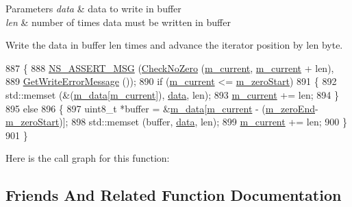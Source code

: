 \begin{DoxyParams}{Parameters}
{\em data} & data to write in buffer \\
\hline
{\em len} & number of times data must be written in buffer\\
\hline
\end{DoxyParams}
Write the data in buffer len times and advance the iterator position by len byte. 
\begin{DoxyCode}
887 \{
888   \hyperlink{assert_8h_aff5ece9066c74e681e74999856f08539}{NS\_ASSERT\_MSG} (\hyperlink{classns3_1_1Buffer_1_1Iterator_a0e3ce8d8b629c64493095486d4408ffd}{CheckNoZero} (\hyperlink{classns3_1_1Buffer_1_1Iterator_a762e0242d60f4d717158d0584e4accd6}{m\_current}, 
      \hyperlink{classns3_1_1Buffer_1_1Iterator_a762e0242d60f4d717158d0584e4accd6}{m\_current} + len),
889                  \hyperlink{classns3_1_1Buffer_1_1Iterator_ae37b790336264f34d65971231c3ed1f1}{GetWriteErrorMessage} ());
890   \textcolor{keywordflow}{if} (\hyperlink{classns3_1_1Buffer_1_1Iterator_a762e0242d60f4d717158d0584e4accd6}{m\_current} <= \hyperlink{classns3_1_1Buffer_1_1Iterator_aa1d37de1fc02ff0bf9efde8ea6ee5097}{m\_zeroStart})
891     \{
892       std::memset (&(\hyperlink{classns3_1_1Buffer_1_1Iterator_a406cd27bb4983e8ba23542eadbc9330b}{m\_data}[\hyperlink{classns3_1_1Buffer_1_1Iterator_a762e0242d60f4d717158d0584e4accd6}{m\_current}]), \hyperlink{topology-example-sim_8cc_a26c65296e316af77b787dc77469bb2a4}{data}, len);
893       \hyperlink{classns3_1_1Buffer_1_1Iterator_a762e0242d60f4d717158d0584e4accd6}{m\_current} += len;
894     \}
895   \textcolor{keywordflow}{else}
896     \{
897       uint8\_t *buffer = &\hyperlink{classns3_1_1Buffer_1_1Iterator_a406cd27bb4983e8ba23542eadbc9330b}{m\_data}[\hyperlink{classns3_1_1Buffer_1_1Iterator_a762e0242d60f4d717158d0584e4accd6}{m\_current} - (\hyperlink{classns3_1_1Buffer_1_1Iterator_a556e752ebfc82c2704fae79ce36aec6f}{m\_zeroEnd}-
      \hyperlink{classns3_1_1Buffer_1_1Iterator_aa1d37de1fc02ff0bf9efde8ea6ee5097}{m\_zeroStart})];
898       std::memset (buffer, \hyperlink{topology-example-sim_8cc_a26c65296e316af77b787dc77469bb2a4}{data}, len);
899       \hyperlink{classns3_1_1Buffer_1_1Iterator_a762e0242d60f4d717158d0584e4accd6}{m\_current} += len;
900     \}
901 \}
\end{DoxyCode}


Here is the call graph for this function\+:




\subsection{Friends And Related Function Documentation}
